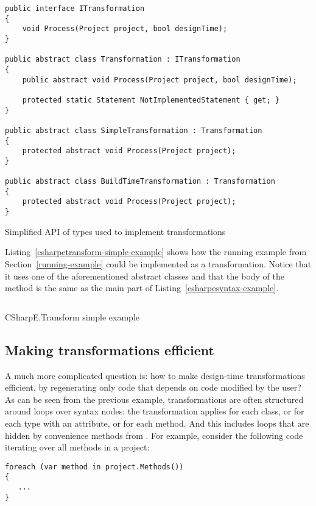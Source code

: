 \begin{listing}
\begin{verbatim}
public interface ITransformation
{
    void Process(Project project, bool designTime);
}

public abstract class Transformation : ITransformation
{
    public abstract void Process(Project project, bool designTime);

    protected static Statement NotImplementedStatement { get; }
}

public abstract class SimpleTransformation : Transformation
{
    protected abstract void Process(Project project);
}

public abstract class BuildTimeTransformation : Transformation
{
    protected abstract void Process(Project project);
}
\end{verbatim}
\caption{Simplified \ac{API} of types used to implement transformations}
\label{itransformation-api}
\end{listing}

Listing~\ref{csharpetransform-simple-example} shows how the running example from Section~\ref{running-example} could be implemented as a transformation. Notice that it uses one of the aforementioned abstract classes and that the body of the method is the same as the main part of Listing~\ref{csharpesyntax-example}.

\begin{listing}
\inputminted[firstline=9,lastline=27]{csharp}{samples/CSharpETransform.Simple/EntityTransformation.cs}
\caption{CSharpE.Transform simple example}
\label{csharpetransform-simple-example}
\end{listing}

\subsection{Making transformations efficient}

A much more complicated question is: how to make design-time transformations efficient, by regenerating only code that depends on code modified by the user? As can be seen from the previous example, transformations are often structured around  loops over syntax nodes: the transformation applies for each class, or for each type with an attribute, or for each method. And this includes  loops that are hidden by convenience methods from . For example, consider the following code iterating over all methods in a project:

\begin{verbatim}
foreach (var method in project.Methods())
{
   ...
}
\end{verbatim}

